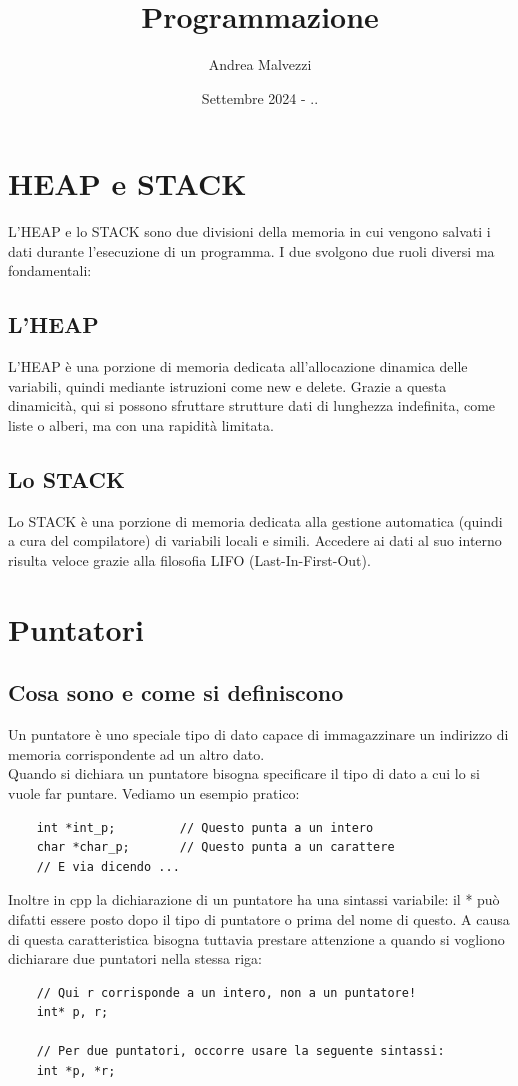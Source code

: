 \documentclass[12pt]{article}
\title{\textbf{Programmazione}}
\date{Settembre 2024 - ..}
\author{Andrea Malvezzi}
\begin{document}
\maketitle

\pagebreak
\tableofcontents

\pagebreak
\section{HEAP e STACK}
\label{sec:HEAP_STACK}
L'HEAP e lo STACK sono due divisioni della memoria in cui vengono salvati i dati durante l'esecuzione di un programma. 
I due svolgono due ruoli diversi ma fondamentali:

\subsection{L'HEAP}
\label{ssec:HEAP}
L'HEAP è una porzione di memoria dedicata all'allocazione dinamica delle variabili, quindi mediante istruzioni come new e delete. Grazie a questa dinamicità, qui si possono sfruttare strutture dati di lunghezza indefinita, come liste o alberi, ma con una rapidità limitata.

\subsection{Lo STACK}
\label{ssec:STACK}
Lo STACK è una porzione di memoria dedicata alla gestione automatica (quindi a cura del compilatore) di variabili locali e simili. Accedere ai dati al suo interno risulta veloce grazie alla filosofia LIFO (Last-In-First-Out).

\section{Puntatori}
\label{sec:pointers}

\subsection{Cosa sono e come si definiscono}
\label{ssec:whats_pointers}
Un puntatore è uno speciale tipo di dato capace di immagazzinare un indirizzo di memoria corrispondente ad un altro dato. \\
Quando si dichiara un puntatore bisogna specificare il tipo di dato a cui lo si vuole far puntare. Vediamo un esempio pratico:
\begin{lstlisting}
    int *int_p;         // Questo punta a un intero
    char *char_p;       // Questo punta a un carattere
    // E via dicendo ...
\end{lstlisting}
Inoltre in cpp la dichiarazione di un puntatore ha una sintassi variabile: il * può difatti essere posto dopo il tipo di puntatore o prima del nome di questo. A causa di questa caratteristica bisogna tuttavia prestare attenzione a quando si vogliono dichiarare due puntatori nella stessa riga:
\begin{lstlisting}
    // Qui r corrisponde a un intero, non a un puntatore!
    int* p, r;

    // Per due puntatori, occorre usare la seguente sintassi:
    int *p, *r;
\end{lstlisting}
\end{document}

